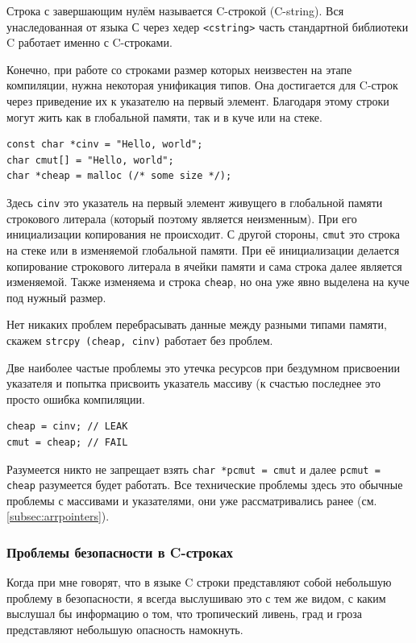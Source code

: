 \documentclass[a4paper,12pt,oneside]{article}
\begin{document}
Строка с завершающим нулём называется C-строкой (C-string). Вся унаследованная от языка С через хедер \lstinline!<cstring>! часть стандартной библиотеки C работает именно с C-строками.

Конечно, при работе со строками размер которых неизвестен на этапе компиляции, нужна некоторая унификация типов. Она достигается для C-строк через приведение их к указателю на первый элемент. Благодаря этому строки могут жить как в глобальной памяти, так и в куче или на стеке.

\begin{lstlisting}
const char *cinv = "Hello, world";
char cmut[] = "Hello, world";
char *cheap = malloc (/* some size */);
\end{lstlisting}

Здесь \lstinline!cinv! это указатель на первый элемент живущего в глобальной памяти строкового литерала (который поэтому является неизменным). При его инициализации копирования не происходит. С другой стороны, \lstinline!cmut! это строка на стеке или в изменяемой глобальной памяти. При её инициализации делается копирование строкового литерала в ячейки памяти и сама строка далее является изменяемой. Также изменяема и строка \lstinline!cheap!, но она уже явно выделена на куче под нужный размер.

Нет никаких проблем перебрасывать данные между разными типами памяти, скажем \lstinline!strcpy (cheap, cinv)! работает без проблем.

Две наиболее частые проблемы это утечка ресурсов при бездумном присвоении указателя и попытка присвоить указатель массиву (к счастью последнее это просто ошибка компиляции.

\begin{lstlisting}
cheap = cinv; // LEAK
cmut = cheap; // FAIL
\end{lstlisting}

Разумеется никто не запрещает взять \lstinline!char *pcmut = cmut! и далее \lstinline!pcmut = cheap! разумеется будет работать. Все технические проблемы здесь это обычные проблемы с массивами и указателями, они уже рассматривались ранее (см. \ref{subsec:arrpointers}).

\subsubsection{Проблемы безопасности в C-строках}\label{subsub:secproblems}

Когда при мне говорят, что в языке C строки представляют собой небольшую проблему в безопасности, я всегда выслушиваю это с тем же видом, с каким выслушал бы информацию о том, что тропический ливень, град и гроза представляют небольшую опасность намокнуть.
\end{document}
